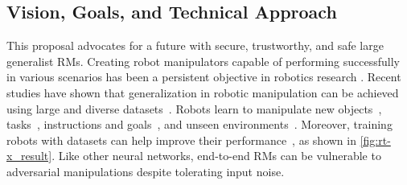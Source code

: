 \documentclass[11pt,letterpaper]{article}
\begin{document}
\subsection{Vision, Goals, and Technical Approach} \label{sec:vision}

This proposal advocates for a future with secure, trustworthy, and safe large generalist RMs.
Creating robot manipulators capable of performing successfully in various scenarios has been a persistent objective in robotics research \cite{kaelbling2020foundation,9,rt-1,rt-2,zhang2024vla}. 
Recent studies have shown that generalization in robotic manipulation can be achieved using large and diverse datasets~\cite{pinto2016supersizing,kaelbling2020foundation,levine2018learning,xu2025vla,arai2025covla}. 
Robots learn to manipulate new objects~\cite{pinto2016supersizing,levine2018learning,finn2017deep,young2021visual,9},  tasks~\cite{james2018task,dasari2021transformers,jang2022bc,9},  instructions and goals~\cite{nair2022learning,jang2022bc,jiang2023vima,mees2022matters}, and unseen environments~\cite{hansen2020self,cui2022play,9}. 
Moreover, training robots with \xot datasets can help improve their performance~\cite{9}, as shown in \autoref{fig:rt-x_result}.
Like other neural networks, end-to-end RMs can be vulnerable to adversarial manipulations despite tolerating input noise.
\end{document}
